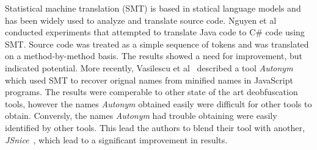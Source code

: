 Statistical machine translation (SMT) is based in statical language models and has been widely used to analyze and translate source code. Nguyen et al~\cite{nguyen2013lexical} conducted experiments that attempted to translate Java code to C\# code using SMT. Source code was treated as a simple sequence of tokens and was translated on a method-by-method basis. The results showed a need for improvement, but indicated potential. More recently, Vasilescu et al~\cite{vasilescu2017recovering} described a tool \textit{Autonym} which used SMT to recover orignal names from minified names in JavaScript programs. The results were comperable to other state of the art deobfuscation tools, however the names \textit{Autonym} obtained easily were difficult for other tools to obtain. Conversly, the names \textit{Autonym} had trouble obtaining were easily identified by other tools. This lead the authors to blend their tool with another, \textit{JSnice}~\cite{raychev2015predicting}, which lead to a significant improvement in results.
